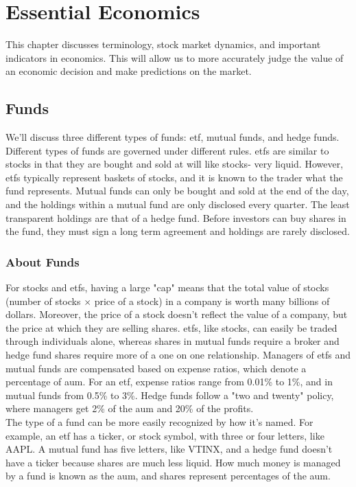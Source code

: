 \chapter{Essential Economics}
This chapter discusses terminology, stock market dynamics, and important indicators in economics. This will allow us to more accurately judge the value of an economic decision and make predictions on the market.

\section{Funds}

We'll discuss three different types of funds: \acf*{etf}, mutual funds, and hedge funds. Different types of funds are governed under different rules. \ac*{etf}s are similar to stocks in that they are bought and sold at will like stocks- very liquid. However, \ac*{etf}s typically represent baskets of stocks, and it is known to the trader what the fund represents. Mutual funds can only be bought and sold at the end of the day, and the holdings within a mutual fund are only disclosed every quarter. The least transparent holdings are that of a hedge fund. Before investors can buy shares in the fund, they must sign a long term agreement and holdings are rarely disclosed. \\

\subsection{About Funds}

For stocks and \ac*{etf}s, having a large "cap" means that the total value of stocks (number of stocks $\times$ price of a stock) in a company is worth many billions of dollars. Moreover, the price of a stock doesn't reflect the value of a company, but the price at which they are selling shares. \ac*{etf}s, like stocks, can easily be traded through individuals alone, whereas shares in mutual funds require a broker and hedge fund shares require more of a one on one relationship. Managers of \ac{etf}s and mutual funds are compensated based on expense ratios, which denote a percentage of \ac{aum}. For an \ac{etf}, expense ratios range from 0.01\% to 1\%, and in mutual funds from 0.5\% to 3\%. Hedge funds follow a "two and twenty" policy, where managers get 2\% of the \ac{aum} and 20\% of the profits.\\

The type of a fund can be more easily recognized by how it's named. For example, an \ac*{etf} has a ticker, or stock symbol, with three or four letters, like AAPL. A mutual fund has five letters, like VTINX, and a hedge fund doesn't have a ticker because shares are much less liquid. How much money is managed by a fund is known as the \ac{aum}, and shares represent percentages of the \ac{aum}. \\

